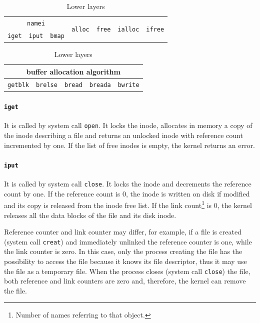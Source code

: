\begin{table}
\centering
\begin{tabular}{|c|c|c|cc|cc|}
\hline 
\multicolumn{3}{|c|}{\texttt{namei}} & \multirow{2}{*}{\texttt{alloc}} & \multirow{2}{*}{\texttt{free}} & \multirow{2}{*}{\texttt{ialloc}} & \multirow{2}{*}{\texttt{ifree}} \\\cline{1-3} 
\texttt{iget} & \texttt{iput} & \texttt{bmap} & & & & \\ 
\hline 
\end{tabular}
\caption{Upper layers}
\label{system_mgmt_upper_layers}

\begin{tabular}{|c|c|c|c|c|}
\hline 
\multicolumn{5}{|c|}{buffer allocation algorithm} \\ 
\hline 
\texttt{getblk} & \texttt{brelse} & \texttt{bread} & \texttt{breada} & \texttt{bwrite} \\ 
\hline 
\end{tabular} 
\caption{Lower layers}
\label{system_mgmt_lower_layers}
\end{table}

\paragraph{\texttt{iget}} It is called by system call \texttt{open}. It locks the inode, allocates in memory a copy of the inode describing a file and returns an unlocked inode with reference count incremented by one. If the list of free inodes is empty, the kernel returns an error.

\paragraph{\texttt{iput}} It is called by system call \texttt{close}. It locks the inode and decrements the reference count by one. If the reference count is 0, the inode is written on disk if modified and its copy is released from the inode free list. If the link count\footnote{Number of names referring to that object.} is 0, the kernel releases all the data blocks of the file and its disk inode.

Reference counter and link counter may differ, for example, if a file is created (system call \texttt{creat}) and immediately unlinked the reference counter is one, while the link counter is zero. In this case, only the process creating the file has the possibility to access the file because it knows its file descriptor, thus it may use the file as a temporary file. When the process closes (system call \texttt{close}) the file, both reference and link counters are zero and, therefore, the kernel can remove the file.

